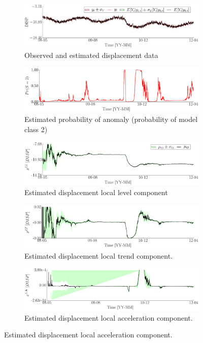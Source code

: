 \begin{figure}[h!]
\centering
\begin{subfigure}{\linewidth}
\includegraphics[width=0.9\linewidth]{./docfigs/Example_DISPSIM_ANOMALY/default/DISP_ObservedPredicted.pdf}
\caption{Observed and estimated displacement data}
\end{subfigure}
\begin{subfigure}{\linewidth}
\includegraphics[width=0.9\linewidth]{./docfigs/Example_DISPSIM_ANOMALY/default/ModelProbability.pdf} 
\caption{Estimated probability of anomaly (probability of model class 2)}
\end{subfigure}
\begin{subfigure}{\linewidth}
\includegraphics[width=0.9\linewidth]{./docfigs/Example_DISPSIM_ANOMALY/default/DISP_LL_1.pdf} 
\caption{Estimated displacement local level component}
\end{subfigure}
\begin{subfigure}{\linewidth}
\includegraphics[width=0.9\linewidth]{./docfigs/Example_DISPSIM_ANOMALY/default/DISP_LT_2.pdf}
\caption{Estimated displacement local trend component.}
\end{subfigure}
\begin{subfigure}{\linewidth}
\includegraphics[width=0.9\linewidth]{./docfigs/Example_DISPSIM_ANOMALY/default/DISP_LAc_3.pdf}
\caption{Estimated displacement local acceleration component.}
\end{subfigure}
\end{figure}
